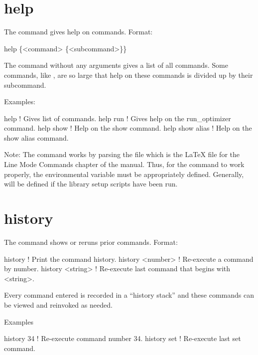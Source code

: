 \vskip 0.2in

\section{help}
\label{s:help}

The  command gives help on \tao commands. Format:
\begin{example}
  help \{<command> \{<subcommand>\}\}
\end{example}

\vskip 0.2in

The  command without any arguments gives a list of all commands.
Some commands, like , are so large that help on these commands
is divided up by their subcommand.

Examples:
\begin{example}
  help            ! Gives list of commands.
  help run        ! Gives help on the run_optimizer command.
  help show       ! Help on the show command.
  help show alias ! Help on the show alias command.
\end{example}

Note: The  command works by parsing the file
 which is the LaTeX file for the
Line Mode Commands chapter of the \tao manual. Thus, for the 
command to work properly, the environmental variable  must
be appropriately defined. Generally,  will be defined if
the \bmad library setup scripts have been run.

\section{history}
\label{s:history}

The  command shows or reruns prior commands.  Format:
\begin{example}
  history           ! Print the command history.
  history <number>  ! Re-execute a command by number.
  history <string>  ! Re-execute last command that begins with <string>.
\end{example}

\vskip 0.2in
Every \tao command entered is recorded in a ``history stack'' and
these commands can be viewed and reinvoked as needed. 

Examples
\begin{example}
  history 34   ! Re-execute command number 34.
  history set  ! Re-execute last set command.  
\end{example}

